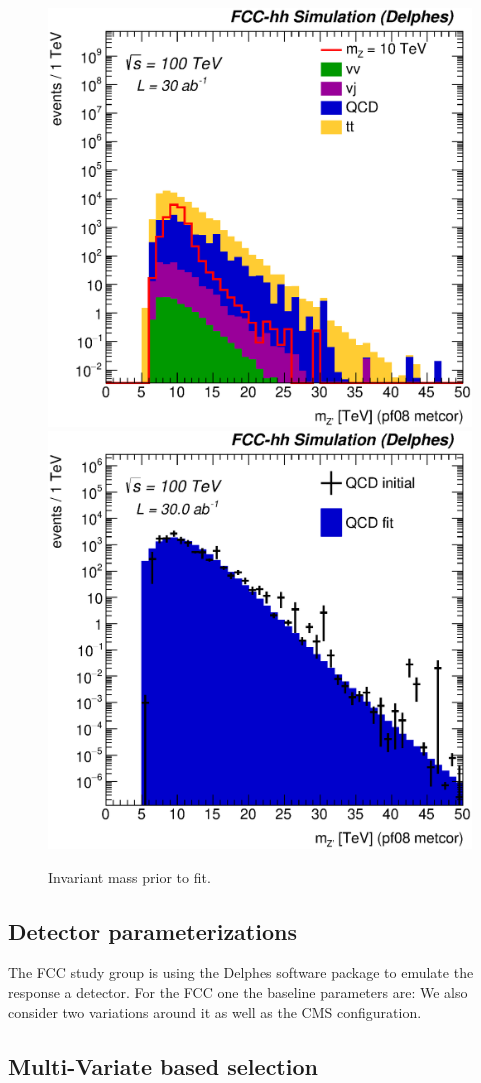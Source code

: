 \begin{figure}[!htb]\centering
\includegraphics[width=0.33\columnwidth]{Fig/Zptt/Mj1j2_pf08_MetCorr_sel8_nostack_log.eps}
\includegraphics[width=0.33\columnwidth]{Fig/Zptt/Zptt_QCD_sel8_Mj1j2_pf08_MetCorr_fit.eps}
\caption{Invariant mass prior to fit.}
\label{fig:hadronicresonances_nofit}
\end{figure}

\subsection{Detector parameterizations}
\label{subsec:detparam}

The FCC study group is using the Delphes software package to emulate the response a detector. 
For the FCC one the baseline parameters are:
We also consider two variations around it as well as the CMS configuration.


\subsection{Multi-Variate based selection}
\label{subsec:mvatagger}

